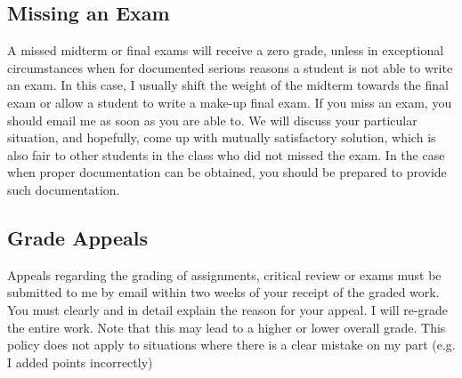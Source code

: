 \documentclass[letterpaper,12pt]{article}
\theoremstyle{dotlessS}
\begin{document}
\subsection*{Missing an Exam}
A missed midterm or final exams will receive a zero grade, unless in exceptional circumstances when for documented serious reasons a student is not able to write an exam. In this case, I usually shift the weight of the midterm towards the final exam or allow a student to write a make-up final exam. If you miss an exam, you should email me as soon as you are able to. We will discuss your particular situation, and hopefully, come up with mutually satisfactory solution, which is also fair to other students in the class who did not missed the exam. In the case when proper documentation can be obtained, you should be prepared to provide such documentation. 

\subsection*{Grade Appeals}
Appeals regarding the grading of assignments, critical review or exams must be submitted to me by email within two weeks of your receipt of the graded work. You must clearly and in detail explain the reason for your appeal. I will re-grade the entire work. Note that this may lead to a higher or lower overall grade. This policy does not apply to situations where there is a clear mistake on my part (e.g. I added points incorrectly)
\end{document}
